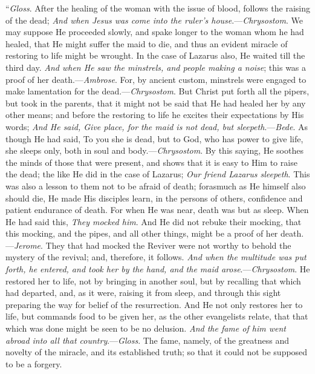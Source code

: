``\emph{Gloss}. After the healing of
the woman with the issue of blood, follows the raising of the dead; \emph{And
when Jesus was come into the ruler's house}.—\emph{Chrysostom}. We
may suppose He proceeded slowly, and spake longer to the woman whom he
had healed, that He might suffer the maid to die, and thus an evident
miracle of restoring to life might be wrought. In the case of Lazarus
also, He waited till the third day. \emph{And when He saw the minstrels,
and people making a noise}; this was a proof of her death.—\emph{Ambrose}.
For, by ancient custom, minstrels were
engaged to make lamentation for the dead.—\emph{Chrysostom}. But
Christ put forth all the pipers, but took in the parents, that it might
not be said that He had healed her by any other means; and before the
restoring to life he excites their expectations by His words; \emph{And He
said, Give place, for the maid is not dead, but sleepeth}.—\emph{Bede}.
As though He had said, To you she is dead, but to God, who has power to
give life, she sleeps only, both in soul and body.—\emph{Chrysostom}.
By this saying, He soothes the minds of those that were present, and
shows that it is easy to Him to raise the dead; the like He did in the
case of Lazarus; \emph{Our friend Lazarus sleepeth}. This was also a
lesson to them not to be afraid of death; forasmuch as He himself also
should die, He made His disciples learn, in the persons of others,
confidence and patient endurance of death. For when He was near, death
was but as sleep. When He had said this, \emph{They mocked him}. And He
did not rebuke their mocking, that this mocking, and the pipes, and all
other things, might be a proof of her death.—\emph{Jerome}. They that
had mocked the Reviver were not worthy to behold the mystery of the
revival; and, therefore, it follows. \emph{And when the multitude was put
forth, he entered, and took her by the hand, and the maid arose}.—\emph{Chrysostom}.
He restored her to life, not by bringing in another soul, but by
recalling that which had departed, and, as it were, raising it from
sleep, and through this sight preparing the way for belief of the
resurrection. And He not only restores her to life, but commands food to
be given her, as the other evangelists relate, that that which was done
might be seen to be no delusion. \emph{And the fame of him went abroad into
all that country}.—\emph{Gloss}. The fame, namely, of the greatness
and novelty of the miracle, and its established truth; so that it could
not be supposed to be a forgery.

